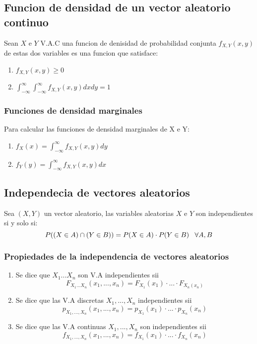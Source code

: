 \documentclass[titlepage,a4paper]{article}
\begin{document}
\subsection{Funcion de densidad de un vector aleatorio continuo}
Sean $X$ e $Y$ V.A.C una funcion de denisidad de probabilidad conjunta $f_{X,Y}(x,y)$ de 
estas dos variables es una funcion que satisface:
\begin{enumerate}
    \item $f_{X,Y}(x,y) \geq 0$
    \item $ \int_{-\infty}^{\infty} \int_{-\infty}^{\infty} f_{X,Y}(x,y) dxdy = 1 $
\end{enumerate}
\subsubsection{Funciones de densidad marginales}
Para calcular las funciones de densidad marginales de X e Y:
\begin{enumerate}
    \item $f_{X}(x) = \int_{-\infty}^{\infty} f_{X,Y}(x,y) dy$
    \item $f_{Y}(y) = \int_{-\infty}^{\infty} f_{X,Y}(x,y) dx$
\end{enumerate}

\subsection{Independecia de vectores aleatorios}
Sea $(X,Y)$ un vector aleatorio, las variables aleatorias $X$ e $Y$ son independientes
si y solo si:
\begin{equation*}
    P((X \in A) \cap (Y \in B)) = P(X \in A) \cdot P(Y \in B) \hspace*{8px} \forall A,B 
\end{equation*}
\subsubsection{Propiedades de la independencia de vectores aleatorios}
\begin{enumerate}
    \item Se dice que $X_{1}...X_{n}$ son V.A independientes sii 
    \begin{equation*}
        F_{X_{1}...X_{n}}(x_{1},...,x_{n}) = F_{X_{1}}(x_{1}) \cdot ... \cdot F_{X_{n}(x_{n})}
    \end{equation*}
    \item Se dice que las V.A discretas $X_{1},...,X_{n}$ independientes sii 
    \begin{equation*}
        p_{X_{1},...,X_{n}} (x_{1},...,x_{n}) = p_{X_{1}}(x_{1}) \cdot ... \cdot p_{X_{n}}(x_{n})
    \end{equation*}
    \item Se dice que las V.A continuas $X_{1},...,X_{n}$ son independientes sii 
    \begin{equation*}
        f_{X_{1},...,X_{n}} (x_{1},...,x_{n}) = f_{X_{1}}(x_{1}) \cdot ... \cdot f_{X_{n}}(x_{n})
    \end{equation*}
\end{enumerate}
\end{document}
